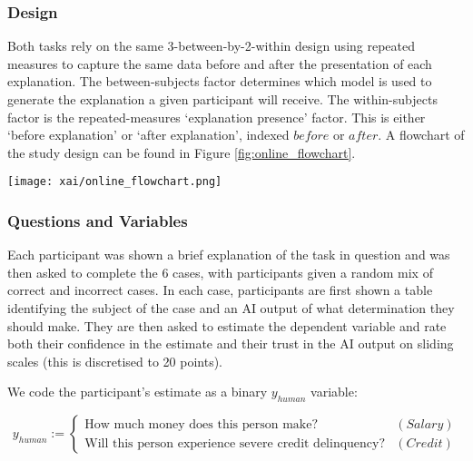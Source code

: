 \subsubsection{Design}
Both tasks rely on the same 3-between-by-2-within design using repeated measures to capture the same data before and after the presentation of each explanation. The between-subjects factor determines which model is used to generate the explanation a given participant will receive. The within-subjects factor is the repeated-measures `explanation presence' factor. This is either `before explanation' or `after explanation', indexed $before$ or $after$. A flowchart of the study design can be found in Figure \ref{fig:online_flowchart}.

\begin{figure*}[htbp]
    \centering
    \texttt{[image: xai/online\_flowchart.png]}
    \caption{Participants in the online study are sorted into six buckets, where each bucket is segregated by explanatory condition and task and shown a brief description of the task (i.e., each participant sees only one of the explanations in Figure \ref{fig:online_explanations}). Then, each participant is shown 6 cases. In each case, participants are shown an applicant profile and an AI output. Participants are asked to agree or disagree with the AI output. Then, participants are given explanations based on their explanatory condition scores. They are then asked again to agree or disagree with the AI output.}
    \label{fig:online_flowchart}
\end{figure*}

\subsubsection{Questions and Variables}\label{sssec:q_and_v}
Each participant was shown a brief explanation of the task in question and was then asked to complete the 6 cases, with participants given a random mix of correct and incorrect cases. In each case, participants are first shown a table identifying the subject of the case and an AI output of what determination they should make. They are then asked to estimate the dependent variable and rate both their confidence in the estimate and their trust in the AI output on sliding scales (this is discretised to 20 points).

We code the participant's estimate as a binary $y_{human}$ variable:

\begin{equation}
    y_{human} := \begin{cases}
        \text{How much money does this person make?} & (Salary) \\
        \text{Will this person experience severe credit delinquency?} & (Credit)
    \end{cases}
\end{equation}

